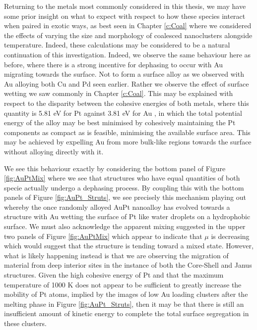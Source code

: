 Returning to the metals most commonly considered in this thesis, we may have some prior insight on what to expect with respect to how these species interact when paired in exotic ways, as best seen in Chapter \ref{c:Coal} where we considered the effects of varying the size and morphology of coalesced nanoclusters alongside temperature. Indeed, these calculations may be considered to be a natural continuation of this investigation. Indeed, we observe the same behaviour here as before, where there is a strong incentive for dephasing to occur with Au migrating towards the surface. Not to form a surface alloy as we observed with Au alloying both Cu and Pd seen earlier. Rather we observe the effect of surface wetting we saw commonly in Chapter \ref{c:Coal}. This may be explained with respect to the disparity between the cohesive energies of both metals, where this quantity is 5.81 eV for Pt against 3.81 eV for Au \cite{kittel_1964}, in which the total potential energy of the alloy may be best minimised by cohesively maintaining the Pt components as compact as is feasible, minimising the available surface area. This may be achieved by expelling Au from more bulk-like regions towards the surface without alloying directly with it. 

We see this behaviour exactly by considering the bottom panel of Figure \ref{fig:AuPtMix} where we see that structures who have equal quantities of both specie actually undergo a dephasing process. By coupling this with the bottom panels of Figure \ref{fig:AuPt_Struts}, we see precisely this mechanism playing out whereby the once randomly alloyed AuPt nanoalloy has evolved towards a structure with Au wetting the surface of Pt like water droplets on a hydrophobic surface. We must also acknowledge the apparent mixing suggested in the upper two panels of Figure \ref{fig:AuPtMix} which appear to indicate that $\mu$ is decreasing which would suggest that the structure is tending toward a mixed state. However, what is likely happening instead is that we are observing the migration of material from deep interior sites in the instance of both the Core-Shell and Janus structures. Given the high cohesive energy of Pt and that the maximum temperature of 1000 K does not appear to be sufficient to greatly increase the mobility of Pt atoms, implied by the images of low Au loading clusters after the melting phase in Figure \ref{fig:AuPt_Struts}, then it may be that there is still an insufficient amount of kinetic energy to complete the total surface segregation in these clusters. 

